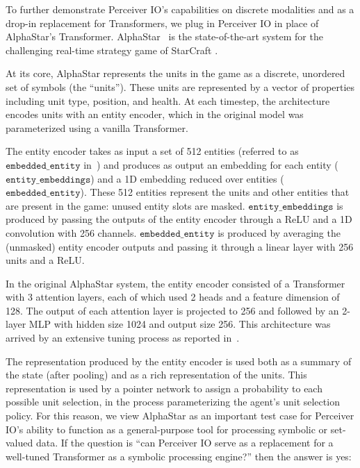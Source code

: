 \documentclass{article} %
\newcommand{\ourmodel}{Perceiver IO\xspace}
\begin{document}
To further demonstrate \ourmodel{}'s capabilities on discrete modalities and as a drop-in replacement for Transformers, we plug in \ourmodel{} in place of AlphaStar's Transformer. AlphaStar~\citep{vinyals2019grandmaster} is the state-of-the-art system for the challenging real-time strategy game of StarCraft . 

At its core, AlphaStar represents the units in the game as a discrete, unordered set of symbols (the ``units''). These units are represented by a vector of properties including unit type, position, and health. At each timestep, the architecture encodes units with an entity encoder, which in the original model was parameterized using a vanilla Transformer.

The entity encoder takes as input a set of 512 entities (referred to as $\texttt{embedded\_entity}$ in~\cite{vinyals2019grandmaster}) and produces as output an embedding for each entity ($\texttt{entity\_embeddings}$) and a 1D embedding reduced over entities ($\texttt{embedded\_entity}$). These 512 entities represent the units and other entities that are present in the game: unused entity slots are masked. $\texttt{entity\_embeddings}$ is produced by passing the outputs of the entity encoder through a ReLU and a 1D convolution with 256 channels. $\texttt{embedded\_entity}$ is produced by averaging the (unmasked) entity encoder outputs and passing it through a linear layer with 256 units and a ReLU.

In the original AlphaStar system, the entity encoder consisted of a Transformer with 3 attention layers, each of which used 2 heads and a feature dimension of 128. The output of each attention layer is projected to 256 and followed by an 2-layer MLP with hidden size 1024 and output size 256. This architecture was arrived by an extensive tuning process as reported in~\cite{vinyals2019grandmaster}.

The representation produced by the entity encoder is used both as a summary of the state (after pooling) and as a rich representation of the units. This representation is used by a pointer network \citep{vinyals2015pointer} to assign a probability to each possible unit selection, in the process parameterizing the agent's unit selection policy. For this reason, we view AlphaStar as an important test case for \ourmodel{}'s ability to function as a general-purpose tool for processing symbolic or set-valued data. If the question is ``can \ourmodel{} serve as a replacement for a well-tuned Transformer as a symbolic processing engine?'' then the answer is yes:
\end{document}
